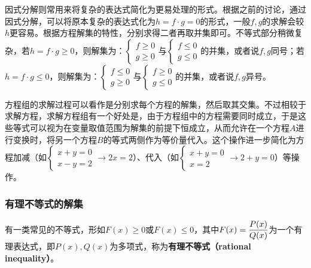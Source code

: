 因式分解则常用来将复杂的表达式简化为更易处理的形式。根据之前的讨论，通过因式分解，可以将原本复杂的表达式化为$h=f\cdot g=0$的形式，一般$f,g$的求解会较$h$更容易。根据方程解集的特性，分别求得二者再取并集即可。不等式部分稍微复杂，若$h=f\cdot g\geq0$，则解集为：$\begin{cases}f \geq 0 \\ g \geq 0\end{cases}$与$\begin{cases}f \leq 0 \\ g \leq 0\end{cases}$的并集，或者说$f,g$同号；若$h=f\cdot g\leq0$，则解集为：$\begin{cases}f \leq 0 \\ g \geq 0\end{cases}$与$\begin{cases}f \geq 0 \\ g \leq 0\end{cases}$的并集，或者说$f,g$异号。

方程组的求解过程可以看作是分别求每个方程的解集，然后取其交集。不过相较于求解方程，求解方程组有一个好处是，由于方程组中的方程需要同时成立，于是这些等式可以视为在变量取值范围为解集的前提下恒成立，从而允许在一个方程$A$进行变换时，将另一个方程$B$的等式两侧作为等价量代入。这个操作进一步简化为方程加减（如$\begin{cases}x+y= 0 \\ x-y =2\end{cases}\to 2x=2$）、代入（如$\begin{cases}x+y= 0 \\ x=2\end{cases}\to 2+y=0$）等操作。

\subsubsection{有理不等式的解集}

有一类常见的不等式，形如$F(x) \geq 0$或$F(x) \leq 0$，其中$\displaystyle F(x)={P(x)\over Q(x)}$为一个有理表达式，即$P(x),Q(x)$为多项式，称为\textbf{有理不等式（rational inequality）}。


